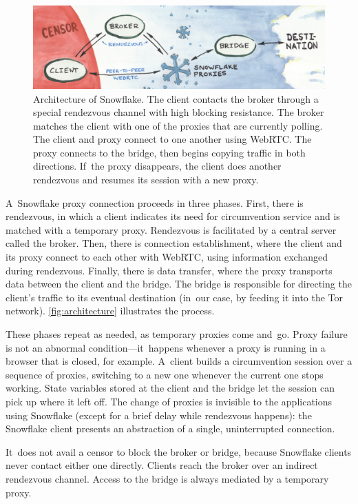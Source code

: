 \documentclass[letterpaper,twocolumn]{article}
\begin{document}
\begin{figure}[t]
\includegraphics[trim={0 2mm 0 4mm},clip]{figures/architecture/architecture.jpg}
\caption{
Architecture of Snowflake.
The client contacts the broker through a special rendezvous channel with high blocking resistance.
The broker matches the client with one of the proxies that are currently polling.
The client and proxy connect to one another using WebRTC.
The proxy connects to the bridge,
then begins copying traffic in both directions.
If~the proxy disappears,
the client does another rendezvous
and resumes its session with a new proxy.
}
\label{fig:architecture}
\end{figure}

A~Snowflake proxy connection proceeds in three phases.
First, there is rendezvous, in which a client
indicates its need for circumvention service
and is matched with a temporary proxy.
Rendezvous is facilitated by a central server called the broker.
Then, there is connection establishment,
where the client and its proxy connect to each other
with WebRTC, using information exchanged during rendezvous.
Finally, there is data transfer,
where the proxy transports data
between the client and the bridge.
The bridge is responsible for directing the client's traffic
to its eventual destination
(in~our case, by feeding it into the Tor network).
\autoref{fig:architecture} illustrates the process.

These phases repeat as needed, as temporary proxies come and~go.
Proxy failure is not an abnormal condition---it~happens whenever
a proxy is running in a browser that is closed, for example.
A~client builds a circumvention session over
a sequence of proxies, switching to a new one
whenever the current one stops working.
State variables stored at the client and the bridge
let the session can pick up where it left off.
The change of proxies is invisible to the applications using Snowflake
(except for a brief delay while rendezvous happens):
the Snowflake client presents an abstraction of a single, uninterrupted connection.

It~does not avail a censor to block the broker or bridge,
because Snowflake clients never contact either one directly.
Clients reach the broker over an indirect rendezvous channel.
Access to the bridge is always mediated by a temporary proxy.
\end{document}
